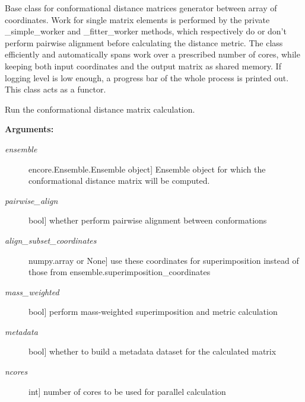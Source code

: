 \documentclass[letterpaper,10pt,english]{sphinxmanual}
\begin{document}
\begin{fulllineitems}
\label{index:encore.confdistmatrix.ConformationalDistanceMatrixGenerator}
Base class for conformational distance matrices generator between array of coordinates. Work for single matrix elements is performed by the private \_simple\_worker and \_fitter\_worker methods, which respectively do or don't perform pairwise alignment before calculating the distance metric. The class efficiently and automatically spans work over a prescribed number of cores, while keeping both input coordinates and the output matrix as shared memory. If logging level is low enough, a progress bar of the whole process is printed out. This class acts as a functor.

\begin{fulllineitems}
\label{index:encore.confdistmatrix.ConformationalDistanceMatrixGenerator.run}
Run the conformational distance matrix calculation.

\textbf{Arguments:}
\begin{description}
\item[{\emph{ensemble}}] \leavevmode{[}encore.Ensemble.Ensemble object{]}
Ensemble object for which the conformational distance matrix will be computed.

\item[{\emph{pairwise\_align}}] \leavevmode{[}bool{]}
whether perform pairwise alignment between conformations

\item[{\emph{align\_subset\_coordinates}}] \leavevmode{[}numpy.array or None{]}
use these coordinates for superimposition instead of those from ensemble.superimposition\_coordinates

\item[{\emph{mass\_weighted}}] \leavevmode{[}bool{]}
perform mass-weighted superimposition and metric calculation

\item[{\emph{metadata}}] \leavevmode{[}bool{]}
whether to build a metadata dataset for the calculated matrix

\item[{\emph{ncores}}] \leavevmode{[}int{]}
number of cores to be used for parallel calculation


\end{description}
\end{fulllineitems}
\end{fulllineitems}
\end{document}
